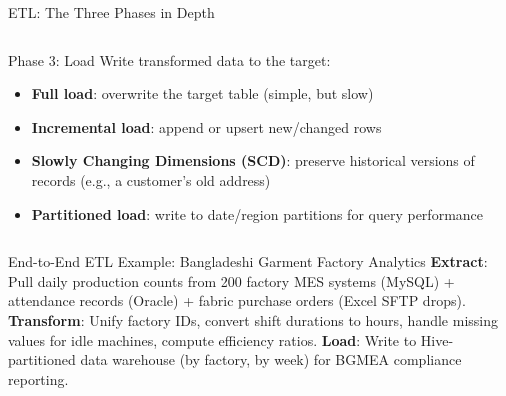 \documentclass[aspectratio=169,10pt]{beamer}
\begin{document}
\begin{frame}{ETL: The Three Phases in Depth}
\begin{columns}[T]
      \begin{alertblock}{Phase 3: Load}
        \vspace{2pt}
        Write transformed data to the target:
        \begin{itemize}
          \small
          \item \textbf{Full load}: overwrite the target table (simple, but slow)
          \item \textbf{Incremental load}: append or upsert new/changed rows
          \item \textbf{Slowly Changing Dimensions (SCD)}: preserve historical versions of records (e.g., a customer's old address)
          \item \textbf{Partitioned load}: write to date/region partitions for query performance
        \end{itemize}
      \end{alertblock}
  \end{columns}
  \vspace{8pt}
  \begin{block}{End-to-End ETL Example: Bangladeshi Garment Factory Analytics}
    \small \textbf{Extract}: Pull daily production counts from 200 factory MES systems (MySQL) + attendance records (Oracle) + fabric purchase orders (Excel SFTP drops). \textbf{Transform}: Unify factory IDs, convert shift durations to hours, handle missing values for idle machines, compute efficiency ratios. \textbf{Load}: Write to Hive-partitioned data warehouse (by factory, by week) for BGMEA compliance reporting.
  \end{block}
\end{frame}
\end{document}
